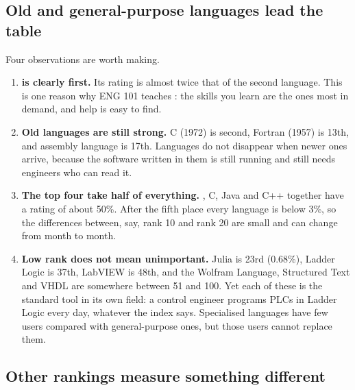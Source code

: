 \subsection*{Old and general-purpose languages lead the table}

Four observations are worth making.

\begin{enumerate}
\item \textbf{\py is clearly first.} Its rating is almost twice that of the second
  language. This is one reason why ENG 101 teaches \py: the skills you learn are the ones
  most in demand, and help is easy to find.
\item \textbf{Old languages are still strong.} C (1972) is second, Fortran (1957) is
  13th, and assembly language is 17th. Languages do not disappear when newer ones arrive,
  because the software written in them is still running and still needs engineers who can
  read it.
\item \textbf{The top four take half of everything.} \py, C, Java and C++ together have
  a rating of about 50\%. After the fifth place every language is below 3\%, so the
  differences between, say, rank 10 and rank 20 are small and can change from month to
  month.
\item \textbf{Low rank does not mean unimportant.} Julia is 23rd (0.68\%), Ladder Logic
  is 37th, LabVIEW is 48th, and the Wolfram Language, Structured Text and VHDL are
  somewhere between 51 and 100. Yet each of these is the standard tool in its own field: a
  control engineer programs PLCs in Ladder Logic every day, whatever the index says.
  Specialised languages have few users compared with general-purpose ones, but those
  users cannot replace them.
\end{enumerate}

\subsection*{Other rankings measure something different}

